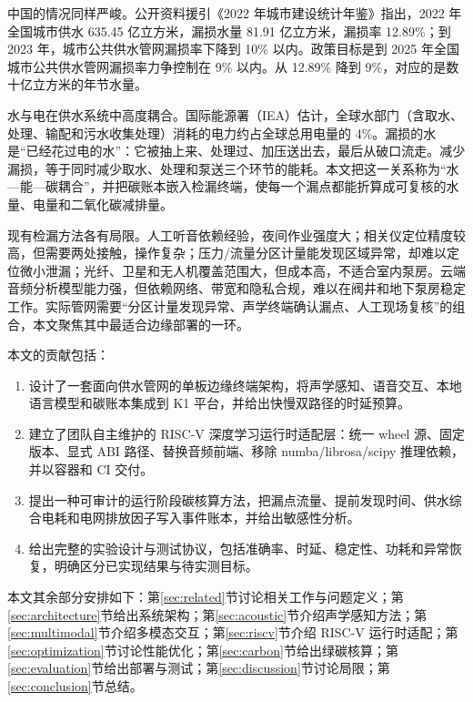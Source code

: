 \documentclass[UTF8,11pt,a4paper,fontset=none]{ctexart}
\begin{document}
中国的情况同样严峻。公开资料援引《2022 年城市建设统计年鉴》指出，2022 年全国城市供水 635.45 亿立方米，漏损水量 81.91 亿立方米，漏损率 12.89\%\cite{pingdingshan}；到 2023 年，城市公共供水管网漏损率下降到 10\% 以内\cite{gmw}。政策目标是到 2025 年全国城市公共供水管网漏损率力争控制在 9\% 以内\cite{mohurd}。从 12.89\% 降到 9\%，对应的是数十亿立方米的年节水量。

水与电在供水系统中高度耦合。国际能源署（IEA）估计，全球水部门（含取水、处理、输配和污水收集处理）消耗的电力约占全球总用电量的 4\%\cite{iea}。漏损的水是“已经花过电的水”：它被抽上来、处理过、加压送出去，最后从破口流走。减少漏损，等于同时减少取水、处理和泵送三个环节的能耗。本文把这一关系称为“水—能—碳耦合”，并把碳账本嵌入检漏终端，使每一个漏点都能折算成可复核的水量、电量和二氧化碳减排量。

现有检漏方法各有局限。人工听音依赖经验，夜间作业强度大；相关仪定位精度较高，但需要两处接触，操作复杂；压力/流量分区计量能发现区域异常，却难以定位微小泄漏；光纤、卫星和无人机覆盖范围大，但成本高，不适合室内泵房。云端音频分析模型能力强，但依赖网络、带宽和隐私合规，难以在阀井和地下泵房稳定工作。实际管网需要“分区计量发现异常、声学终端确认漏点、人工现场复核”的组合，本文聚焦其中最适合边缘部署的一环。

本文的贡献包括：

\begin{enumerate}
  \item 设计了一套面向供水管网的单板边缘终端架构，将声学感知、语音交互、本地语言模型和碳账本集成到 K1 平台，并给出快慢双路径的时延预算。
  \item 建立了团队自主维护的 RISC-V 深度学习运行时适配层：统一 wheel 源、固定版本、显式 ABI 路径、替换音频前端、移除 numba/librosa/scipy 推理依赖，并以容器和 CI 交付。
  \item 提出一种可审计的运行阶段碳核算方法，把漏点流量、提前发现时间、供水综合电耗和电网排放因子写入事件账本，并给出敏感性分析。
  \item 给出完整的实验设计与测试协议，包括准确率、时延、稳定性、功耗和异常恢复，明确区分已实现结果与待实测目标。
\end{enumerate}

本文其余部分安排如下：第\ref{sec:related}节讨论相关工作与问题定义；第\ref{sec:architecture}节给出系统架构；第\ref{sec:acoustic}节介绍声学感知方法；第\ref{sec:multimodal}节介绍多模态交互；第\ref{sec:riscv}节介绍 RISC-V 运行时适配；第\ref{sec:optimization}节讨论性能优化；第\ref{sec:carbon}节给出绿碳核算；第\ref{sec:evaluation}节给出部署与测试；第\ref{sec:discussion}节讨论局限；第\ref{sec:conclusion}节总结。
\end{document}
